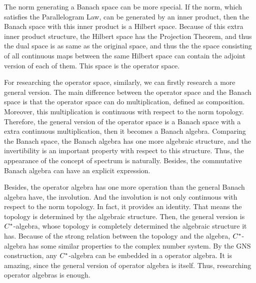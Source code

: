  The norm generating a Banach space can be more special. If the norm, which satisfies the Parallelogram Law, can be generated by an inner product, then the Banach space with this inner product is a Hilbert space. Because of this extra inner product structure, the Hilbert space has the Projection Theorem, and thus the dual space is as same as the original space, and thus the the space consisting of all continuous maps between the same Hilbert space can contain the adjoint version of each of them. This space is the operator space.

For researching the operator space, similarly, we can firstly research a more general version. The main difference between the operator space and the Banach space is that the operator space can do multiplication, defined as composition. Moreover, this multiplication is continuous with respect to the norm topology. Therefore, the general version of the operator space is a Banach space with a extra continuous multiplication, then it becomes a Banach algebra. Comparing the Banach space, the Banach algebra has one more algebraic structure, and the invertibility is an important property with respect to this structure. Thus, the appearance of the concept of spectrum is naturally. Besides, the commutative Banach algebra can have an explicit expression. 

Besides, the operator algebra has one more operation than the general Banach algebra have, the involution. And the involution is not only continuous with respect to the norm topology. In fact, it provides an identity. That means the topology is determined by the algebraic structure. Then, the general version is $C^{*}$-algebra, whose topology is completely determined the algebraic structure it has. Because of the strong relation between the topology and the algebra, $C^{*}$-algebra has some similar properties to the complex number system. By the GNS construction, any $C^{*}$-algebra can be embedded in a operator algebra. It is amazing, since the general version of operator algebra is itself. Thus, researching operator algebras is enough.

